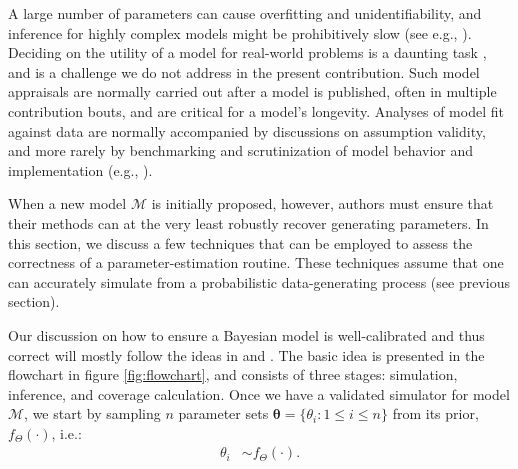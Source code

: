 \documentclass[oneside]{article}
\begin{document}
A large number of parameters can cause overfitting and unidentifiability, and inference for highly complex models might be prohibitively slow (see e.g., \citealp{lartillot11}).
Deciding on the utility of a model for real-world problems is a daunting task \citep{brown18,shepherd18}, and is a challenge we do not address in the present contribution.
Such model appraisals are normally carried out after a model is published, often in multiple  contribution bouts, and are critical for a model's longevity.
Analyses of model fit against data are normally accompanied by discussions on assumption validity, and more rarely by benchmarking and scrutinization of model behavior and implementation (e.g., \citealp{maddison07,rabosky15,rabosky13,moore16,stadler10,luo20}).

When a new model $\mathcal{M}$ is initially proposed, however, authors must ensure that their methods 
can at the very least robustly recover generating parameters.
In this section, we discuss a few techniques that can be employed to assess the correctness of a parameter-estimation routine.
These techniques assume that one can accurately simulate from a probabilistic data-generating process (see previous section).

\vspace{.25cm}


Our discussion on how to ensure a Bayesian model is well-calibrated and thus correct will mostly follow the ideas in \citet{Cook2006} and \citet{Talts2018}.
The basic idea is presented in the flowchart in figure \ref{fig:flowchart}, and consists of three stages: simulation, inference, and coverage calculation.
Once we have a validated simulator for model $\mathcal{M}$, we start by sampling $n$ parameter sets $\boldsymbol{\theta} = \{\theta_i : 1 \leq i \leq n\}$ from its prior,
$f_\Theta(\cdot)$, i.e.:
\begin{align*}
 \theta_i & \sim f_\Theta(\cdot).
\end{align*}
\end{document}

